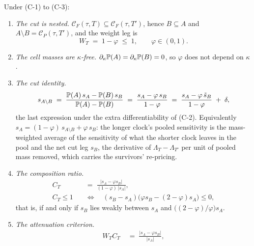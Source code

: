\begin{corollary}
\label{cor:caught}
Under (C-1) to (C-3):
\begin{enumerate}[label=(\roman*),leftmargin=2.4em,itemsep=3pt]
\item \emph{The cut is nested.} $\mathcal{C}_F(\tau,T)\subseteq\mathcal{C}_F(\tau,T')$, hence
  $B \subseteq A$ and $A\setminus B = \mathcal{C}_P(\tau,T')$, and the weight leg is
  \begin{equation}
  \label{eq:caught-WT}
  W_T \;=\; 1-\varphi \;\le\; 1 ,
  \qquad \varphi\in(0,1).
  \end{equation}
\item \emph{The cell masses are $\kappa$-free.}
  $\partial_\kappa\mathbb{P}(A) = \partial_\kappa\mathbb{P}(B) = 0$, so $\varphi$ does not depend on $\kappa$.
\item \emph{The cut identity.}
  \begin{equation}
  \label{eq:caught-identity}
  s_{A\setminus B}
  \;=\;
  \frac{\mathbb{P}(A)\,s_A - \mathbb{P}(B)\,s_B}{\mathbb{P}(A)-\mathbb{P}(B)}
  \;=\;
  \frac{s_A - \varphi\,s_B}{1-\varphi}
  \;=\;
  \frac{s_A - \varphi\,\tilde s_B}{1-\varphi} \;+\; \delta ,
  \end{equation}
  the last expression under the extra differentiability of (C-2). Equivalently
  $s_A = (1-\varphi)\,s_{A\setminus B} + \varphi\,s_B$: the longer clock's pooled sensitivity is
  the mass-weighted average of the sensitivity of what the shorter clock leaves in the pool and
  the net cut leg $s_B$, the derivative of $\Lambda_T-\Lambda_{T'}$ per unit of pooled mass removed, which
  carries the survivors' re-pricing.
\item \emph{The composition ratio.}
  \begin{equation}
  \label{eq:caught-CT}
  \begin{aligned}
  C_T \;&=\; \frac{|s_A-\varphi s_B|}{(1-\varphi)\,|s_A|}, \\[3pt]
  C_T \le 1 \quad&\Longleftrightarrow\quad
  (s_B-s_A)\bigl(\varphi s_B-(2-\varphi)s_A\bigr) \le 0 ,
  \end{aligned}
  \end{equation}
  that is, if and only if $s_B$ lies weakly between $s_A$ and
  $\bigl((2-\varphi)/\varphi\bigr)s_A$.
\item \emph{The attenuation criterion.}
  \begin{equation}
  \label{eq:caught-WTCT}
  \begin{aligned}
  W_T C_T \;&=\; \frac{|s_A-\varphi s_B|}{|s_A|}, \\[3pt]

\end{aligned}
\end{equation}
\end{enumerate}
\end{corollary}
